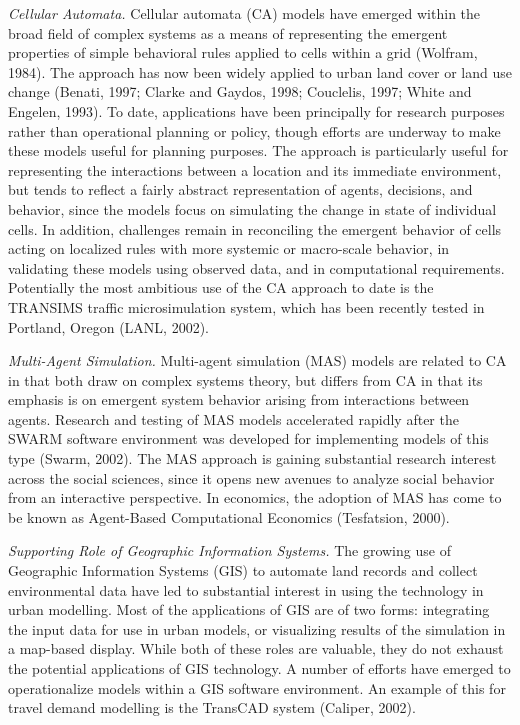 \emph{Cellular Automata.}  Cellular automata (CA) models have emerged within the broad field of complex systems as a means of representing the emergent properties of simple behavioral rules applied to cells within a grid (Wolfram, 1984).  The approach has now been widely applied to urban land cover or land use change (Benati, 1997; Clarke and Gaydos, 1998; Couclelis, 1997; White and Engelen, 1993).  To date, applications have been principally for research purposes rather than operational planning or policy, though efforts are underway to make these models useful for planning purposes.  The approach is particularly useful for representing the interactions between a location and its immediate environment, but tends to reflect a fairly abstract representation of agents, decisions, and behavior, since the models focus on simulating the change in state of individual cells.  In addition, challenges remain in reconciling the emergent behavior of cells acting on localized rules with more systemic or macro-scale behavior, in validating these models using observed data, and in computational requirements.  Potentially the most ambitious use of the CA approach to date is the TRANSIMS traffic microsimulation system, which has been recently tested in Portland, Oregon (LANL, 2002).

\emph{Multi-Agent Simulation.}  Multi-agent simulation (MAS) models are related to CA in that both draw on complex systems theory, but differs from CA in that its emphasis is on emergent system behavior arising from interactions between agents.  Research and testing of MAS models accelerated rapidly after the SWARM software environment was developed for implementing models of this type (Swarm, 2002).  The MAS approach is gaining substantial research interest across the social sciences, since it opens new avenues to analyze social behavior from an interactive perspective.  In economics, the adoption of MAS has come to be known as Agent-Based Computational Economics (Tesfatsion, 2000).

\emph{Supporting Role of Geographic Information Systems.}  The growing use of Geographic Information Systems (GIS) to automate land records and collect environmental data have led to substantial interest in using the technology in urban modelling.  Most of the applications of GIS are of two forms: integrating the input data for use in urban models, or visualizing results of the simulation in a map-based display.  While both of these roles are valuable, they do not exhaust the potential applications of GIS technology.  A number of efforts have emerged to operationalize models within a GIS software environment.  An example of this for travel demand modelling is the TransCAD system (Caliper, 2002).

